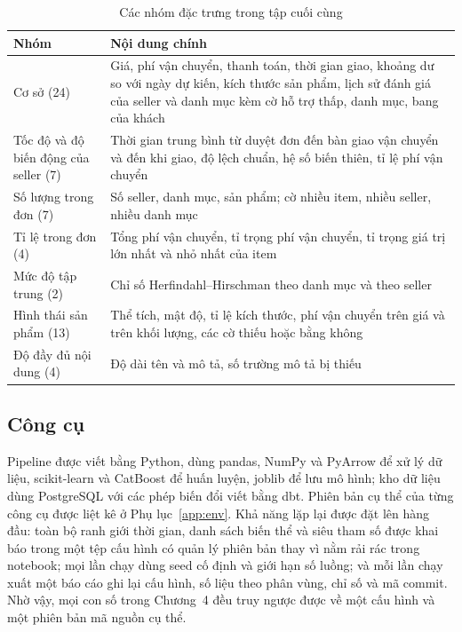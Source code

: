 \documentclass[12pt,a4paper]{report}
\begin{document}
\begin{table}[htbp]\centering\small
\caption{Các nhóm đặc trưng trong tập cuối cùng}\label{tab:features}
\begin{tabular}{p{4.2cm}p{9cm}}
\toprule
Nhóm & Nội dung chính \\
\midrule
Cơ sở (24) & Giá, phí vận chuyển, thanh toán, thời gian giao, khoảng dư so với ngày dự kiến, kích thước sản phẩm, lịch sử đánh giá của seller và danh mục kèm cờ hỗ trợ thấp, danh mục, bang của khách \\
Tốc độ và độ biến động của seller (7) & Thời gian trung bình từ duyệt đơn đến bàn giao vận chuyển và đến khi giao, độ lệch chuẩn, hệ số biến thiên, tỉ lệ phí vận chuyển \\
Số lượng trong đơn (7) & Số seller, danh mục, sản phẩm; cờ nhiều item, nhiều seller, nhiều danh mục \\
Tỉ lệ trong đơn (4) & Tổng phí vận chuyển, tỉ trọng phí vận chuyển, tỉ trọng giá trị lớn nhất và nhỏ nhất của item \\
Mức độ tập trung (2) & Chỉ số Herfindahl--Hirschman theo danh mục và theo seller \\
Hình thái sản phẩm (13) & Thể tích, mật độ, tỉ lệ kích thước, phí vận chuyển trên giá và trên khối lượng, các cờ thiếu hoặc bằng không \\
Độ đầy đủ nội dung (4) & Độ dài tên và mô tả, số trường mô tả bị thiếu \\
\bottomrule
\end{tabular}
\end{table}

\subsection{Công cụ}

Pipeline được viết bằng Python, dùng pandas, NumPy và PyArrow để xử lý dữ liệu, scikit-learn và CatBoost để huấn luyện, joblib để lưu mô hình; kho dữ liệu dùng PostgreSQL với các phép biến đổi viết bằng dbt. Phiên bản cụ thể của từng công cụ được liệt kê ở Phụ lục~\ref{app:env}. Khả năng lặp lại được đặt lên hàng đầu: toàn bộ ranh giới thời gian, danh sách biến thể và siêu tham số được khai báo trong một tệp cấu hình có quản lý phiên bản thay vì nằm rải rác trong notebook; mọi lần chạy dùng seed cố định và giới hạn số luồng; và mỗi lần chạy xuất một báo cáo ghi lại cấu hình, số liệu theo phân vùng, chỉ số và mã commit. Nhờ vậy, mọi con số trong Chương~4 đều truy ngược được về một cấu hình và một phiên bản mã nguồn cụ thể.
\end{document}

